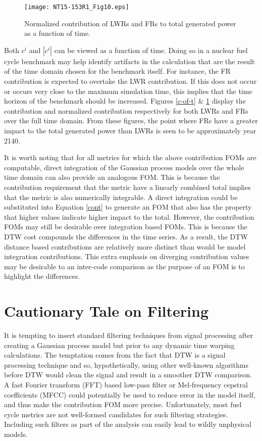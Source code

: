 \documentclass{ntmanuscript}
\begin{document}
\begin{figure}[htb]
\centering
\texttt{[image: NT15-153R1\_Fig10.eps]}
\caption{Normalized contribution of LWRs and FRs to total generated power
as a function of time.}
\label{normc-of-t}
\end{figure}

Both $c^i$ and $|c^i|$ can be viewed as a function of time.
Doing so in a nuclear fuel cycle benchmark may help identify artifacts in the
calculation that are the result of the time domain chosen for the benchmark itself.
For instance, the FR contribution is expected to overtake the LWR contribution.
If this does not occur or occurs very close to the maximum simulation time,
this implies that the time horizon of the benchmark should be increased.
Figures \ref{c-of-t} \& \ref{normc-of-t} display the contribution and
normalized contribution respectively for both LWRs and FRs over the full
time domain. From these figures, the point where FRs have a greater impact
to the total generated power
than LWRs is seen to be approximately year 2140.

It is worth noting that for all metrics for which the above contribution FOMs
are computable, direct integration of the Gaussian process models over
the whole time domain can also provide an analogous FOM. This is because the
contribution requirement that the metric have a linearly combined total
implies that the metric is also numerically integrable. A direct integration
could be substituted into Equation \ref{cont} to generate an FOM that also
has the property that higher values indicate higher impact
to the total. However, the contribution FOMs may still be desirable over
integration based FOMs.  This is because the DTW cost compounds the
differences in the time series. As a result, the DTW distance based
contributions are relatively more distinct than would be model integration
contributions. This extra emphasis on diverging contribution values may be
desirable to an inter-code comparison as the purpose of an FOM is to
highlight the differences.

\clearpage
\section{Cautionary Tale on Filtering}
\label{filtering}

It is tempting to insert standard filtering techniques from signal processing
after creating a Gaussian process model but prior to any dynamic time warping
calculations. The temptation comes from the fact that DTW is a signal
processing technique and so, hypothetically, using other well-known algorithms
before DTW would clean the signal and result in a smoother DTW comparison.
A fast Fourier transform (FFT) based low-pass filter
\cite{merletti1999standards,moreland2003fft} or
Mel-frequency cepstral coefficients (MFCC) \cite{muda2010voice,imai1983cepstral}
could potentially be used to reduce error in the model itself,
and thus make the contribution FOM more precise. Unfortunately, most
fuel cycle metrics are not well-formed candidates for such filtering strategies.
Including such filters as part of the analysis can easily lead to wildly unphysical
models.
\end{document}
